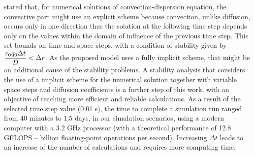 \citeonline[roose2009] stated that, for numerical solutions of convection-dispersion equation, the convective part might use an explicit scheme because convection, unlike diffusion, occurs only in one direction thus the solution at the following time step depends only on the values within the domain of influence of the previous time step. 
This set bounds on time and space steps, with a condition of stability given by $\displaystyle{r_0 q_0 \Delta t \over D} < \Delta r$. 
{\tblue As the proposed model uses a fully implicit scheme, that might be an additional cause of the stability problems. 
A stability analysis that considers the use of a implicit scheme for the numerical solution together with variable space steps and diffusion coefficients is a further step of this work, with an objective of reaching more efficient and reliable calculations.
}
{\tblue As a result of the selected time step value (0.01 s),
the time to complete a simulation run ranged from 40 minutes to 1.5 days, in our simulation scenarios, using a modern computer with a 3.2 GHz processor (with a theoretical performance of 12.8 GFLOPS -- billion floating-point operations per second).
Increasing $\Delta t$ leads to an increase of the number of calculations and requires more computing time.
}




